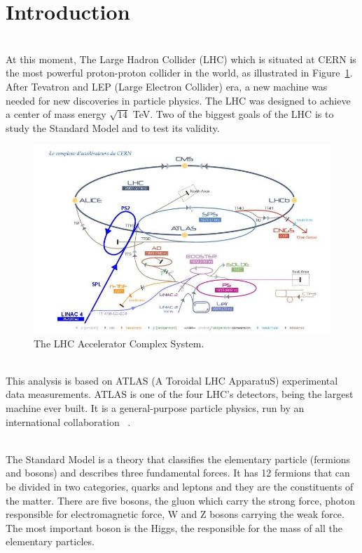 \section{Introduction}
\label{sec:Introduction}

\ \\At this moment, The Large Hadron Collider (LHC) which is situated at CERN is the most powerful proton-proton collider in the world, as illustrated in Figure~\ref{fig:LHC}. After Tevatron and LEP (Large Electron Collider) era, a new machine was needed for new discoveries in particle physics. The LHC was designed to achieve a center of mass energy $\sqrt{14}$ TeV. Two of the biggest goals of the LHC is to study the Standard Model and to test its validity.  

\begin{figure}[h]
  \centering
  \includegraphics[scale = 0.4]{plots/lhc.png} 
  \caption{The LHC Accelerator Complex System.}
  \label{fig:LHC}
\end{figure}

\ \\This analysis is based on ATLAS (A Toroidal LHC ApparatuS) experimental data measurements.  ATLAS is one of the four LHC's detectors, being the largest machine ever built. It is a general-purpose particle physics, run by an international collaboration ~\cite{ATLAS}. 

\ \\The Standard Model is a theory that classifies the elementary particle (fermions and bosons) and describes three fundamental forces. It has 12 fermions that can be divided in two categories, quarks and leptons and they are the constituents of the matter. There are five bosons, the gluon which carry the strong force, photon responsible for electromagnetic force, W and Z bosons carrying the weak force. The most important boson is the Higgs, the responsible for the mass of all the elementary particles. 

